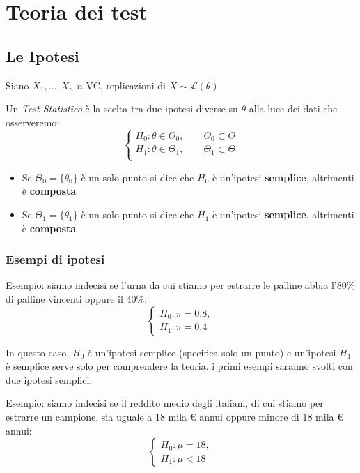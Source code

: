 \documentclass[
  11pt,
]{book}
\providecommand{\tightlist}{%
  \setlength{\itemsep}{0pt}\setlength{\parskip}{0pt}}
\theoremstyle{mytheoremstyle}
\theoremstyle{mydefstyle}
\begin{document}
\chapter{Teoria dei test}\label{teoria-dei-test}

\section{Le Ipotesi}\label{le-ipotesi}

Siano \(X_1,...,X_n\) \(n\) VC, replicazioni di \(X\sim\mathscr{L}(\theta)\)

Un \emph{Test Statistico} è la scelta tra due ipotesi diverse su \(\theta\) alla luce dei dati che osserveremo:
\[\begin{cases}
H_0:\theta\in\Theta_0, \qquad \Theta_0\subset\Theta\\
H_1:\theta\in\Theta_1, \qquad \Theta_1\subset\Theta\\
\end{cases}
\]

\begin{itemize}
\tightlist
\item
  Se \(\Theta_0=\{\theta_0\}\) è un solo punto si dice che \(H_0\) è un'ipotesi \textbf{semplice}, altrimenti è \textbf{composta}
\item
  Se \(\Theta_1=\{\theta_1\}\) è un solo punto si dice che \(H_1\) è un'ipotesi \textbf{semplice}, altrimenti è \textbf{composta}
\end{itemize}

\subsection{Esempi di ipotesi}\label{esempi-di-ipotesi}

Esempio: siamo indecisi se l'urna da cui stiamo per estrarre le palline abbia l'80\% di palline vincenti oppure il 40\%:
\[\begin{cases}
H_0:\pi=0.8, \\
H_1:\pi=0.4
\end{cases}
\]

In questo caso, \(H_0\) è un'ipotesi semplice (specifica solo un punto) e un'ipotesi \(H_1\) è semplice
serve solo per comprendere la teoria. i primi esempi saranno svolti con due ipotesi
semplici.

Esempio: siamo indecisi se il reddito medio degli italiani, di cui stiamo per estrarre un campione, sia uguale a 18 mila € annui oppure minore di 18 mila € annui:
\[\begin{cases}
H_0:\mu=18, \\
H_1:\mu< 18
\end{cases}
\]
\end{document}
